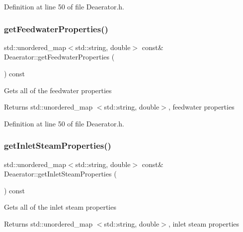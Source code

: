 Definition at line 50 of file Deaerator.\+h.

\mbox{\label{class_deaerator_a74f7916b125f4964b0f534940f590633}} 
\subsubsection{\texorpdfstring{get\+Feedwater\+Properties()}{getFeedwaterProperties()}\hspace{0.1cm}{\footnotesize\ttfamily [3/3]}}
{\footnotesize\ttfamily std\+::unordered\+\_\+map$<$std\+::string, double$>$ const\& Deaerator\+::get\+Feedwater\+Properties (\begin{DoxyParamCaption}{ }\end{DoxyParamCaption}) const\hspace{0.3cm}{\ttfamily [inline]}}

Gets all of the feedwater properties \begin{DoxyReturn}{Returns}
std\+::unordered\+\_\+map $<$std\+::string, double$>$, feedwater properties 
\end{DoxyReturn}


Definition at line 50 of file Deaerator.\+h.

\mbox{\label{class_deaerator_ae777da23f2504f8724850946378b3cf5}} 
\subsubsection{\texorpdfstring{get\+Inlet\+Steam\+Properties()}{getInletSteamProperties()}\hspace{0.1cm}{\footnotesize\ttfamily [1/3]}}
{\footnotesize\ttfamily std\+::unordered\+\_\+map$<$std\+::string, double$>$ const\& Deaerator\+::get\+Inlet\+Steam\+Properties (\begin{DoxyParamCaption}{ }\end{DoxyParamCaption}) const\hspace{0.3cm}{\ttfamily [inline]}}

Gets all of the inlet steam properties \begin{DoxyReturn}{Returns}
std\+::unordered\+\_\+map $<$std\+::string, double$>$, inlet steam properties 
\end{DoxyReturn}


